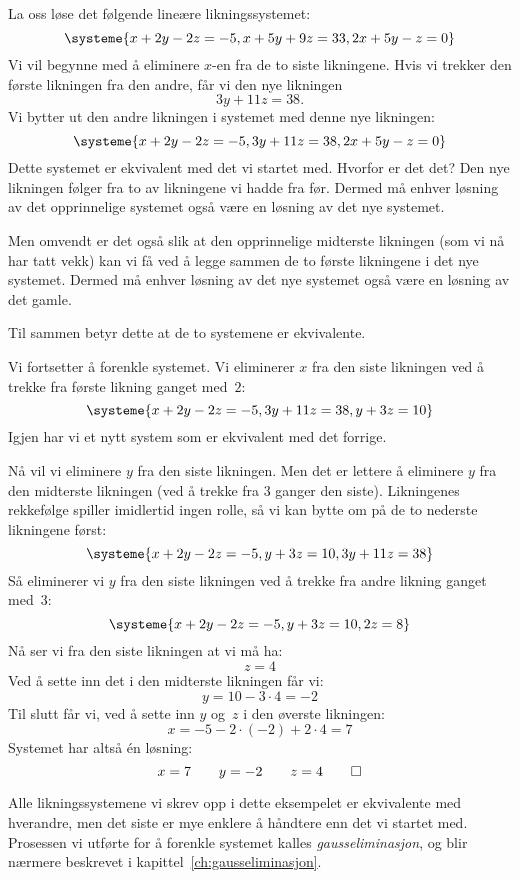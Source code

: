 \begin{ex}
\label{ex:gausseliminasjon}
La oss løse det følgende lineære likningssystemet:
\[
\systeme{
   x + 2y - 2z = -5,
   x + 5y + 9z = 33,
  2x + 5y -  z = 0
}
\]
Vi vil begynne med å eliminere $x$-en fra de to siste likningene.
Hvis vi trekker den første likningen fra den andre, får vi den nye
likningen
\[
3y + 11z = 38.
\]
Vi bytter ut den andre likningen i systemet med denne nye likningen:
\[
\systeme{
   x + 2y -  2z = -5,
       3y + 11z = 38,
  2x + 5y -   z = 0
}
\]
Dette systemet er ekvivalent med det vi startet med.  Hvorfor er det
det?  Den nye likningen følger fra to av likningene vi hadde fra før.
Dermed må enhver løsning av det opprinnelige systemet også være en
løsning av det nye systemet.

Men omvendt er det også slik at den opprinnelige midterste likningen
(som vi nå har tatt vekk) kan vi få ved å legge sammen de to første
likningene i det nye systemet.  Dermed må enhver løsning av det nye
systemet også være en løsning av det gamle.

Til sammen betyr dette at de to systemene er ekvivalente.

Vi fortsetter å forenkle systemet.  Vi eliminerer $x$ fra den siste
likningen ved å trekke fra første likning ganget med~$2$:
\[
\systeme{
   x + 2y -  2z = -5,
       3y + 11z = 38,
        y +  3z = 10
}
\]
Igjen har vi et nytt system som er ekvivalent med det forrige.

Nå vil vi eliminere $y$ fra den siste likningen.  Men det er lettere å
eliminere $y$ fra den midterste likningen (ved å trekke fra $3$ ganger den
siste).  Likningenes rekkefølge spiller imidlertid ingen rolle, så vi
kan bytte om på de to nederste likningene først:
\[
\systeme{
   x + 2y -  2z = -5,
        y +  3z = 10,
       3y + 11z = 38
}
\]
Så eliminerer vi $y$ fra den siste likningen ved å trekke fra andre
likning ganget med~$3$:
\[
\systeme{
   x + 2y - 2z = -5,
        y + 3z = 10,
            2z =  8
}
\]
Nå ser vi fra den siste likningen at vi må ha:
\[
z = 4
\]
Ved å sette inn det i den midterste likningen får vi:
\[
y = 10 - 3 \cdot 4 = -2
\]
Til slutt får vi, ved å sette inn $y$ og~$z$ i den øverste likningen:
\[
x = -5 - 2 \cdot (-2) + 2 \cdot 4 = 7
\]
Systemet har altså én løsning:
\[
x = 7 \qquad
y = -2 \qquad
z = 4
\qedhere
\]
\end{ex}

Alle likningssystemene vi skrev opp i dette eksempelet er ekvivalente
med hverandre, men det siste er mye enklere å håndtere enn det vi
startet med.  Prosessen vi utførte for å forenkle systemet kalles
\emph{gauss\-eliminasjon}, og blir nærmere beskrevet i
kapittel~\ref{ch:gausseliminasjon}.


